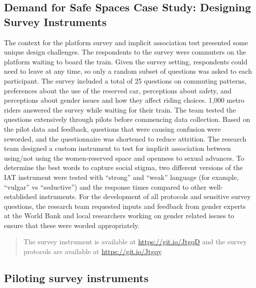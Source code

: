 \documentclass[
]{book}
\begin{document}
\begin{ex}
\hypertarget{demand-for-safe-spaces-case-study-designing-survey-instruments}{%
\subsection{Demand for Safe Spaces Case Study: Designing Survey Instruments}\label{demand-for-safe-spaces-case-study-designing-survey-instruments}}

The context for the platform survey and implicit association test presented some unique design challenges. The respondents to the survey were commuters on the platform waiting to board the train. Given the survey setting, respondents could need to leave at any time, so only a random subset of questions was asked to each participant. The survey included a total of 25 questions on commuting patterns, preferences about the use of the reserved car, perceptions about safety, and perceptions about gender issues and how they affect riding choices. 1,000 metro riders answered the survey while waiting for their train. The team tested the questions extensively through pilots before commencing data collection. Based on the pilot data and feedback, questions that were causing confusion were reworded, and the questionnaire was shortened to reduce attrition.
The research team designed a custom instrument to test for implicit association between using/not using the women-reserved space and openness to sexual advances. To determine the best words to capture social stigma, two different versions of the IAT instrument were tested with ``strong'' and ``weak'' language (for example, ``vulgar'' vs ``seductive'') and the response times compared to other well-established instruments. For the development of all protocols and sensitive survey questions, the research team requested inputs and feedback from gender experts at the World Bank and local researchers working on gender related issues to ensure that these were worded appropriately.

\begin{quote}
The survey instrument is available at \url{https://git.io/JtgqD} and the survey protocols are available at \url{https://git.io/Jtgqy}.
\end{quote}
\end{ex}

\hypertarget{piloting-survey-instruments}{%
\subsection*{Piloting survey instruments}\label{piloting-survey-instruments}}
\end{document}
